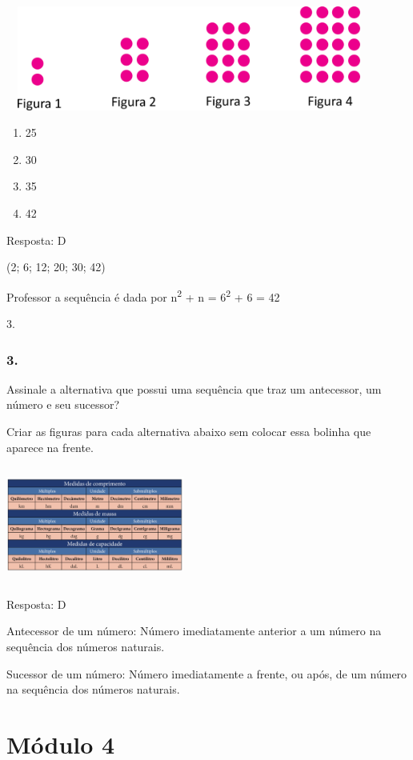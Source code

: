 \includegraphics[width=4.75875in,height=1.35012in]{media/image37.png}

\begin{enumerate}
\def\labelenumi{\alph{enumi})}
\item
  25
\item
  30
\item
  35
\item
  42
\end{enumerate}

Resposta: D

(2; 6; 12; 20; 30; 42)

Professor a sequência é dada por n\textsuperscript{2} + n =
6\textsuperscript{2} + 6 = 42

3.

\subsubsection{3. }\label{section-50}

Assinale a alternativa que possui uma sequência que traz um antecessor,
um número e seu sucessor?

Criar as figuras para cada alternativa abaixo sem colocar essa bolinha
que aparece na frente.

\includegraphics[width=2.30020in,height=1.50013in]{media/image38.png}

Resposta: D

Antecessor de um número: Número imediatamente anterior a um número na
sequência dos números naturais.

Sucessor de um número: Número imediatamente a frente, ou após, de um
número na sequência dos números naturais.

\section{Módulo 4}\label{muxf3dulo-4}

